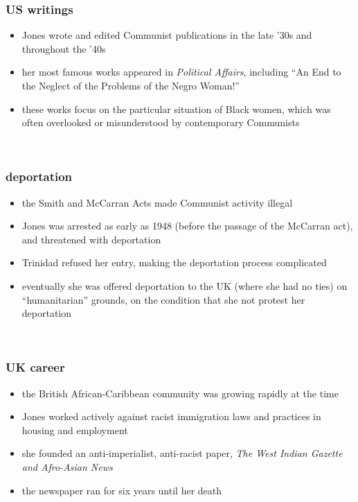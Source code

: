 \documentclass{beamer}
\begin{document}
\begin{frame} 
	\frametitle{US writings}
	\begin{itemize}
		\item Jones wrote and edited Communist publications in the late '30s and throughout the '40s
		\item her most famous works appeared in \emph{Political Affairs}, including ``An End to the Neglect of the Problems of the Negro Woman!'' \citep{Jones49a}
		\item these works focus on the particular situation of Black women, which was often overlooked or misunderstood by contemporary Communists
	\end{itemize}

	\vfill
	\ \hfill \citep{Davies08}
\end{frame}

\begin{frame} 
	\frametitle{deportation}
	\begin{itemize}
		\item the Smith and McCarran Acts made Communist activity illegal
		\item Jones was arrested as early as 1948 (before the passage of the McCarran act), and threatened with deportation
		\item Trinidad refused her entry, making the deportation process complicated
		\item eventually she was offered deportation to the UK (where she had no ties) on ``humanitarian'' grounds, on the condition that she not protest her deportation
	\end{itemize}

	\vfill
	\ \hfill \citep{Davies08}
\end{frame}

\begin{frame} 
	\frametitle{UK career}
	\begin{itemize}
		\item the British African-Caribbean community was growing rapidly at the time
		\item Jones worked actively against racist immigration laws and practices in housing and employment
		\item she founded an anti-imperialist, anti-racist paper, \emph{The West Indian Gazette and Afro-Asian News}
		\item the newspaper ran for six years until her death
	\end{itemize}

	\vfill
	\ \hfill \citep{Davies08}
\end{frame}
\end{document}
